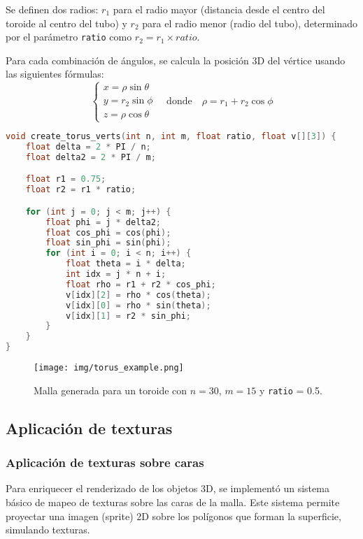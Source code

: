 \documentclass[12pt]{article}
\begin{document}
    Se definen dos radios: $r_1$ para el radio mayor (distancia desde el centro del toroide al centro del tubo) y $r_2$ para el radio menor (radio del tubo), determinado por el parámetro \texttt{ratio} como $r_2 = r_1 \times ratio$.

    Para cada combinación de ángulos, se calcula la posición 3D del vértice usando las siguientes fórmulas:
    \[
        \begin{cases}
            x = \rho \sin \theta \\
            y = r_2 \sin \phi \\
            z = \rho \cos \theta
        \end{cases}
        \quad \text{donde} \quad \rho = r_1 + r_2 \cos \phi
    \]

    \begin{lstlisting}[language=C, caption={Generación de vértices para un toroide}]
void create_torus_verts(int n, int m, float ratio, float v[][3]) {
    float delta = 2 * PI / n;
    float delta2 = 2 * PI / m;

    float r1 = 0.75;
    float r2 = r1 * ratio;

    for (int j = 0; j < m; j++) {
        float phi = j * delta2;
        float cos_phi = cos(phi);
        float sin_phi = sin(phi);
        for (int i = 0; i < n; i++) {
            float theta = i * delta;
            int idx = j * n + i;
            float rho = r1 + r2 * cos_phi;
            v[idx][2] = rho * cos(theta);
            v[idx][0] = rho * sin(theta);
            v[idx][1] = r2 * sin_phi;
        }
    }
}
    \end{lstlisting}

    \begin{figure}[H]
        \centering
        \texttt{[image: img/torus\_example.png]}
        \caption{Malla generada para un toroide con $n = 30$, $m = 15$ y \texttt{ratio} = 0.5.}
    \end{figure}



    \subsection{Aplicación de texturas}

    \subsubsection{Aplicación de texturas sobre caras}

    Para enriquecer el renderizado de los objetos 3D, se implementó un sistema básico de mapeo de texturas sobre las caras de la malla. Este sistema permite proyectar una imagen (sprite) 2D sobre los polígonos que forman la superficie, simulando texturas.
\end{document}
